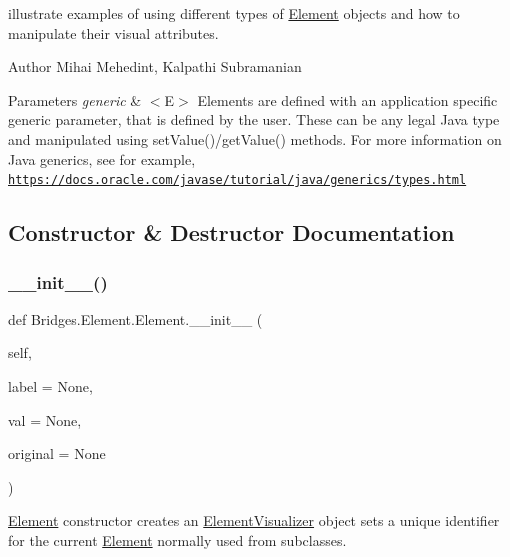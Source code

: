 illustrate examples of using different types of \mbox{\hyperlink{class_bridges_1_1_element_1_1_element}{Element}} objects and how to manipulate their visual attributes.

\begin{DoxyAuthor}{Author}
Mihai Mehedint, Kalpathi Subramanian
\end{DoxyAuthor}

\begin{DoxyParams}{Parameters}
{\em generic} & $<$\+E$>$ Elements are defined with an application specific generic parameter, that is defined by the user. These can be any legal Java type and manipulated using set\+Value()/get\+Value() methods. For more information on Java generics, see for example, \href{https://docs.oracle.com/javase/tutorial/java/generics/types.html}{\tt https\+://docs.\+oracle.\+com/javase/tutorial/java/generics/types.\+html} \\
\hline
\end{DoxyParams}


\subsection{Constructor \& Destructor Documentation}
\mbox{\label{class_bridges_1_1_element_1_1_element_a3cf9af1f49a0e03f8e596c637836a7fe}} 
\subsubsection{\texorpdfstring{\+\_\+\+\_\+init\+\_\+\+\_\+()}{\_\_init\_\_()}}
{\footnotesize\ttfamily def Bridges.\+Element.\+Element.\+\_\+\+\_\+init\+\_\+\+\_\+ (\begin{DoxyParamCaption}\item[{}]{self,  }\item[{}]{label = {\ttfamily None},  }\item[{}]{val = {\ttfamily None},  }\item[{}]{original = {\ttfamily None} }\end{DoxyParamCaption})}



\mbox{\hyperlink{class_bridges_1_1_element_1_1_element}{Element}} constructor creates an \mbox{\hyperlink{namespace_bridges_1_1_element_visualizer}{Element\+Visualizer}} object sets a unique identifier for the current \mbox{\hyperlink{class_bridges_1_1_element_1_1_element}{Element}} normally used from subclasses. 



